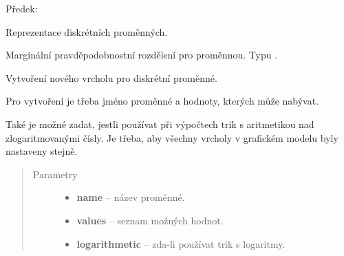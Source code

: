 \begin{fulllineitems}
\label{alex.infer:alex.infer.factor.alex.infer.node.DiscreteVariableNode}
Předek: {\hyperref[alex.infer:alex.infer.factor.alex.infer.node.VariableNode]{}}

Reprezentace diskrétních proměnných.

\begin{fulllineitems}
\label{alex.infer:alex.infer.factor.alex.infer.node.DiscreteVariableNode.belief}
Marginální pravděpodobnostní rozdělení pro proměnnou. Typu {\hyperref[alex.infer:alex.infer.factor.Factor]{}}.

\end{fulllineitems}


\begin{fulllineitems}
\label{alex.infer:alex.infer.factor.alex.infer.node.DiscreteVariableNode.__init__}
Vytvoření nového vrcholu pro diskrétní proměnné.

Pro vytvoření je třeba jméno proměnné a hodnoty, kterých může nabývat.

Také je možné zadat, jestli používat při výpočtech trik s aritmetikou nad zlogaritmovanými čísly.
Je třeba, aby všechny vrcholy v grafickém modelu byly nastaveny stejně.
\begin{quote}\begin{description}
\item[{Parametry}] \leavevmode\begin{itemize}
\item {} 
\textbf{name} -- název proměnné.

\item {} 
\textbf{values} -- seznam možných hodnot.

\item {} 
\textbf{logarithmetic} -- zda-li používat trik s logaritmy.

\end{itemize}

\end{description}\end{quote}


\end{fulllineitems}
\end{fulllineitems}
